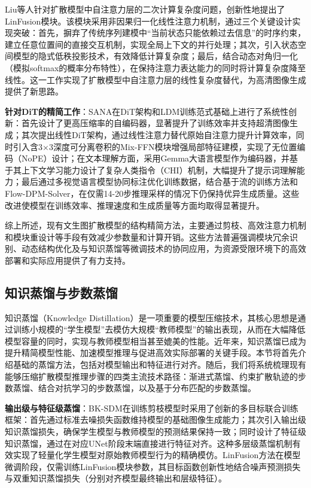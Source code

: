 \documentclass[11pt,a4paper,UTF8]{ctexart}
\begin{document}
Liu等人\cite{liu2024linfusion}针对扩散模型中自注意力层的二次计算复杂度问题，创新性地提出了LinFusion模块。该模块采用非因果归一化线性注意力机制，通过三个关键设计实现突破：首先，摒弃了传统序列建模中“当前状态只能依赖过去信息”的时序约束，建立任意位置间的直接交互机制，实现全局上下文的并行处理；其次，引入状态空间模型的隐式低秩投影技术，有效降低计算复杂度；最后，结合动态对角归一化（模拟softmax的概率分布特性），在保持注意力表达能力的同时将计算复杂度降至线性。这一工作实现了扩散模型中自注意力层的线性复杂度替代，为高清图像生成提供了新思路。

\textbf{针对DiT的精简工作}：SANA\cite{xie2024sana}在DiT架构和LDM训练范式基础上进行了系统性创新：首先设计了更高压缩率的自编码器，显著提升了训练效率并支持超清图像生成；其次提出线性DiT架构，通过线性注意力替代原始自注意力提升计算效率，同时引入含3×3深度可分离卷积的Mix-FFN模块增强局部特征建模，实现了无位置编码（NoPE）设计；在文本理解方面，采用Gemma大语言模型\cite{team2024gemma}作为编码器，并基于其上下文学习能力设计了复杂人类指令（CHI）机制，大幅提升了提示词理解能力；最后通过多视觉语言模型协同标注优化训练数据，结合基于流的训练方法\cite{liu2022flow,karras2022elucidating}和Flow-DPM-Solver，在仅需14-20步推理采样的情况下仍保持优异生成质量。这些改进使模型在训练效率、推理速度和生成质量等方面均取得显著提升。

综上所述，现有文生图扩散模型的结构精简方法，主要通过剪枝、高效注意力机制和模块重设计等手段有效减少参数量和计算开销。这些方法普遍强调模块冗余识别、动态结构优化及与知识蒸馏等微调技术的协同应用，为资源受限环境下的高效部署和实际应用提供了有力支持。


\subsection{知识蒸馏与步数蒸馏}
\label{sec:finetune}

知识蒸馏（Knowledge Distillation）是一项重要的模型压缩技术，其核心思想是通过训练小规模的“学生模型”去模仿大规模“教师模型”的输出表现，从而在大幅降低模型容量的同时，实现与教师模型相当甚至媲美的性能\cite{hinton2015distilling}。近年来，知识蒸馏已成为提升精简模型性能、加速模型推理与促进高效实际部署的关键手段。本节将首先介绍基础的蒸馏方法，包括对模型输出和特征进行对齐。随后，我们将系统梳理现有能够压缩扩散模型推理步骤的四类主流技术路径：渐进式蒸馏、约束扩散轨迹的步数蒸馏、结合对抗学习的步数蒸馏，以及基于分布匹配的步数蒸馏。

\textbf{输出级与特征级蒸馏}：BK-SDM\cite{kim2023bk}在训练剪枝模型时采用了创新的多目标联合训练框架：首先通过标准去噪损失函数维持模型的基础图像生成能力；其次引入输出级知识蒸馏损失，确保学生模型与教师模型的预测结果保持一致；同时设计了特征级知识蒸馏，通过在对应UNet阶段末端直接进行特征对齐。这种多层级蒸馏机制有效实现了轻量化学生模型对原始教师模型行为的精确模仿。LinFusion\cite{liu2024linfusion}方法在模型微调阶段，仅需训练LinFusion模块参数，其目标函数创新性地结合噪声预测损失与双重知识蒸馏损失（分别对齐模型最终输出和层级特征）。
\end{document}
